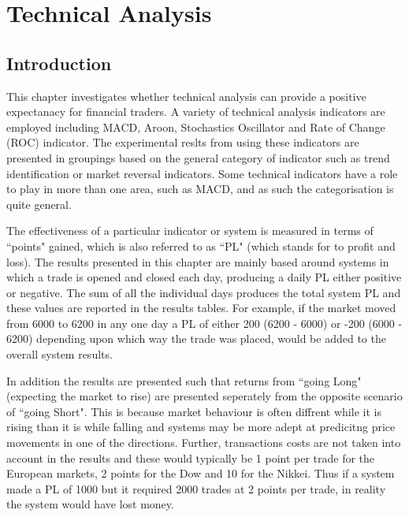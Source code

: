 
\chapter{Technical Analysis} %
 
\label{Chapter4} %



\section{Introduction}
This chapter investigates whether technical analysis can provide a positive expectanacy for financial traders. A variety of technical analysis indicators are employed including MACD, Aroon, Stochastics Oscillator and Rate of Change (ROC) indicator. The experimental reslts from using these indicators are presented in groupings based on the general category of indicator such as trend identification or market reversal indicators. Some technical indicators have a role to play in more than one area, such as MACD, and as such the categorisation is quite general.

The effectiveness of a particular indicator or system is measured in terms of \textquotedblleft points" gained, which is also referred to as \textquotedblleft PL" (which stands for to profit and loss). The results presented in this chapter are mainly based around systems in which a trade is opened and closed each day, producing a daily PL either positive or negative. The sum of all the individual days produces the total system PL and these values are reported in the results tables. For example, if the market moved from 6000 to 6200 in any one day a PL of either 200 (6200 - 6000) or -200 (6000 - 6200) depending upon which way the trade was placed, would be added to the overall system results. 

In addition the results are presented such that returns from \textquotedblleft going Long" (expecting the market to rise) are presented seperately from the opposite scenario of \textquotedblleft going Short". This is because  market behaviour is often diffrent while it is rising than it is while falling and systems may be more adept at predicitng price movements in one of the directions. Further, transactions costs are not taken into account in the results and these would typically be 1 point per trade for the European markets, 2 points for the Dow and 10 for the Nikkei.  Thus if a system made a PL of 1000 but it required 2000 trades at 2 points per trade, in reality the system would have lost money. 

